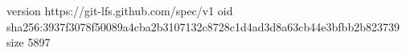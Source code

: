 version https://git-lfs.github.com/spec/v1
oid sha256:3937f3078f50089a4cba2b3107132c8728c1d4ad3d8a63cb44e3bfbb2b823739
size 5897
